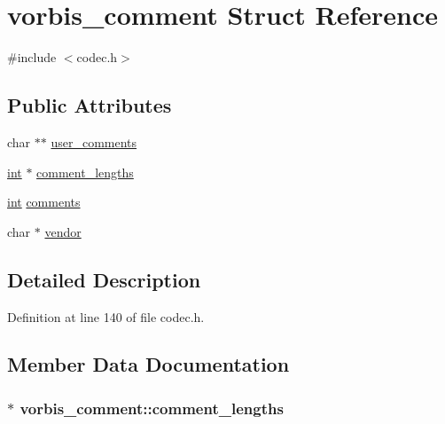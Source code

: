 \hypertarget{structvorbis__comment}{}\section{vorbis\+\_\+comment Struct Reference}
\label{structvorbis__comment}


{\ttfamily \#include $<$codec.\+h$>$}

\subsection*{Public Attributes}
\begin{DoxyCompactItemize}
\item 
char $\ast$$\ast$ \hyperlink{structvorbis__comment_ac45cb70542b0be5ce3e8d85db6df48ec}{user\+\_\+comments}
\item 
\hyperlink{xmltok_8h_a5a0d4a5641ce434f1d23533f2b2e6653}{int} $\ast$ \hyperlink{structvorbis__comment_a4698d400a859e9338a5828ead97cacdf}{comment\+\_\+lengths}
\item 
\hyperlink{xmltok_8h_a5a0d4a5641ce434f1d23533f2b2e6653}{int} \hyperlink{structvorbis__comment_aa338208fb0f485b3818832a7d07dbe92}{comments}
\item 
char $\ast$ \hyperlink{structvorbis__comment_a1f25158a2c045a6dd8a13b33b34612d3}{vendor}
\end{DoxyCompactItemize}


\subsection{Detailed Description}


Definition at line 140 of file codec.\+h.



\subsection{Member Data Documentation}
\subsubsection[{\texorpdfstring{comment\+\_\+lengths}{comment_lengths}}]{$\ast$ vorbis\+\_\+comment\+::comment\+\_\+lengths}\hypertarget{structvorbis__comment_a4698d400a859e9338a5828ead97cacdf}{}\label{structvorbis__comment_a4698d400a859e9338a5828ead97cacdf}


